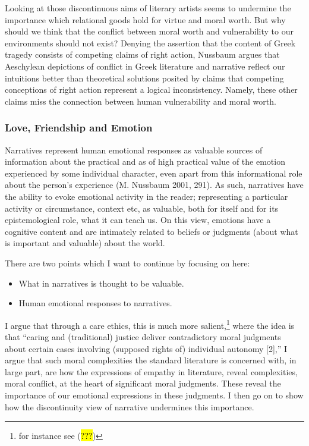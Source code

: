 \documentclass[
  letterpaper,
  DIV=11,
  numbers=noendperiod]{scrartcl}
\theoremstyle{remark}
\begin{document}
Looking at those discontinuous aims of literary artists seems to
undermine the importance which relational goods hold for virtue and
moral worth. But why should we think that the conflict between moral
worth and vulnerability to our environments should not exist? Denying
the assertion that the content of Greek tragedy consists of competing
claims of right action, Nussbaum argues that Aeschylean depictions of
conflict in Greek literature and narrative reflect our intuitions better
than theoretical solutions posited by claims that competing conceptions
of right action represent a logical inconsistency. Namely, these other
claims miss the connection between human vulnerability and moral worth.

\subsubsection{Love, Friendship and
Emotion}\label{love-friendship-and-emotion}

Narratives represent human emotional responses as valuable sources of
information about the practical and as of high practical value of the
emotion experienced by some individual character, even apart from this
informational role about the person's experience (M. Nussbaum 2001,
291). As such, narratives have the ability to evoke emotional activity
in the reader; representing a particular activity or circumstance,
context etc, as valuable, both for itself and for its epistemological
role, what it can teach us. On this view, emotions have a cognitive
content and are intimately related to beliefs or judgments (about what
is important and valuable) about the world.

There are two points which I want to continue by focusing on here:

\begin{itemize}
\item
  What in narratives is thought to be valuable.
\item
  Human emotional responses to narratives.
\end{itemize}

I argue that through a care ethics, this is much more
salient,\footnote{for instance see (\hl{???})} where the idea is that
``caring and (traditional) justice deliver contradictory moral judgments
about certain cases involving (supposed rights of) individual autonomy
{[}2{]},'' I argue that such moral complexities the standard literature
is concerned with, in large part, are how the expressions of empathy in
literature, reveal complexities, moral conflict, at the heart of
significant moral judgments. These reveal the importance of our
emotional expressions in these judgments. I then go on to show how the
discontinuity view of narrative undermines this importance.
\end{document}
